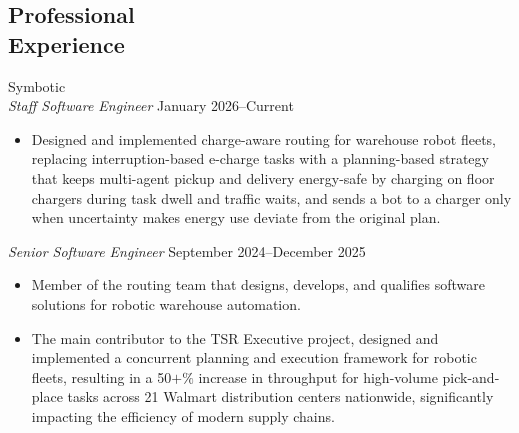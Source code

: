 \documentclass[margin, 10pt]{res} %
\begin{document}
\begin{resume}





 
\section{Professional\\Experience}

{\sc Symbotic}\\
{\sl Staff Software Engineer} \hfill January 2026--Current
\begin{itemize}\sloppy
	\item Designed and implemented charge-aware routing for warehouse robot fleets, replacing interruption-based e-charge tasks with a planning-based strategy that keeps multi-agent pickup and delivery energy-safe by charging on floor chargers during task dwell and traffic waits, and sends a bot to a charger only when uncertainty makes energy use deviate from the original plan.
\end{itemize}
{\sl Senior Software Engineer} \hfill September 2024--December 2025
\begin{itemize}
	\item Member of the routing team that designs, develops, and qualifies software solutions for robotic warehouse automation.
    \item The main contributor to the TSR Executive project,  designed and implemented a concurrent planning and execution framework for robotic fleets, resulting in a 50$+\%$ increase in throughput for high-volume pick-and-place tasks across 21 Walmart distribution centers nationwide, significantly impacting the efficiency of modern supply chains.  
\end{itemize}


\end{resume}
\end{document}
